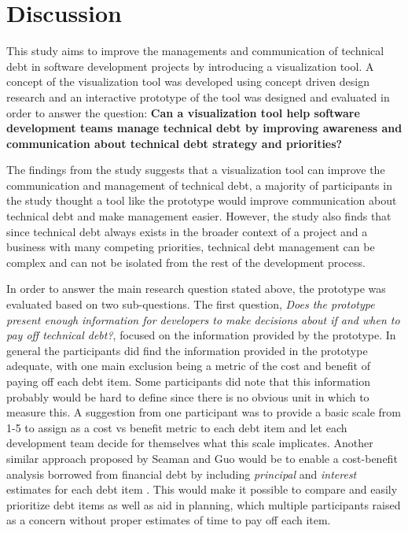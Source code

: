 

\section{Discussion}

This study aims to improve the managements and communication of technical debt in software development projects by introducing a visualization tool.
A concept of the visualization tool was developed using concept driven design research and an interactive prototype of the tool was designed and evaluated in order to answer the question: 
\textbf{Can a visualization tool help software development teams manage technical debt by improving awareness and communication about technical debt strategy and priorities?}

The findings from the study suggests that a visualization tool can improve the communication and management of technical debt, a majority of participants in the study thought a tool like the prototype would improve communication about technical debt and make management easier.
However, the study also finds that since technical debt always exists in the broader context of a project and a business with many competing priorities, technical debt management can be complex and can not be isolated from the rest of the development process.

In order to answer the main research question stated above, the prototype was evaluated based on two sub-questions.
The first question, \textit{Does the prototype present enough information for developers to make decisions about if and when to pay off technical debt?}, focused on the information provided by the prototype.
In general the participants did find the information provided in the prototype adequate, with one main exclusion being a metric of the cost and benefit of paying off each debt item.
Some participants did note that this information probably would be hard to define since there is no obvious unit in which to measure this.
A suggestion from one participant was to provide a basic scale from 1-5 to assign as a cost vs benefit metric to each debt item and let each development team decide for themselves what this scale implicates.
Another similar approach proposed by Seaman and Guo would be to enable a cost-benefit analysis borrowed from financial debt by including \textit{principal} and \textit{interest} estimates for each debt item \cite{seaman_using_2012}.
This would make it possible to compare and easily prioritize debt items as well as aid in planning, which multiple participants raised as a concern without proper estimates of time to pay off each item.

